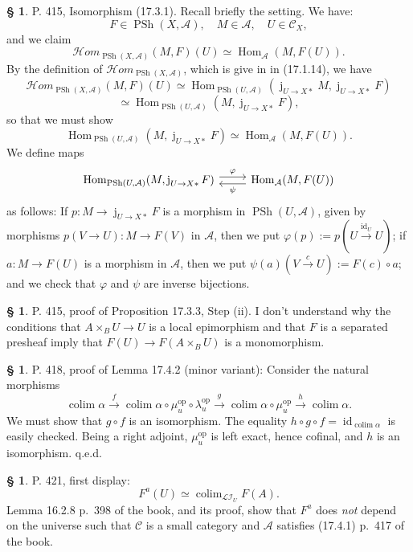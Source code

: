 \documentclass[12pt]{article}%
\theoremstyle{remark}
\theoremstyle{definition}
\newtheorem{s}[thm]{\S}%
\newcommand{\cc}{\mathcal}
\newcommand{\oo}{\operatorname}
\newcommand{\A}{\mathcal A}
\newcommand{\C}{\mathcal C}
\newcommand{\pp}{\varphi}
\newcommand{\xr}{\xrightarrow}
\DeclareMathOperator*{\colim}{colim}
\DeclareMathOperator{\id}{id}
\DeclareMathOperator{\Hom}{Hom}%
\DeclareMathOperator{\op}{op}
\begin{document}
\begin{s}
P. 415, Isomorphism (17.3.1). Recall briefly the setting. We have: 
$$
F\in\oo{PSh}(X,\A),\quad M\in\A,\quad U\in\C_X,
$$ 
and we claim 
\begin{equation}\label{1731}
\cc H\mathit{om}_{\oo{PSh}(X,\A)}(M,F)(U)\simeq\Hom_\A(M,F(U)).
\end{equation} 
By the definition of $\cc H\mathit{om}_{\oo{PSh}(X,\A)}$, which is give in in (17.1.14), we have 
$$
\cc H\mathit{om}_{\oo{PSh}(X,\A)}(M,F)(U)\simeq\Hom_{\oo{PSh}(U,\A)}(\oo j_{U\to X*}M,\oo j_{U\to X*}F)
$$ 
$$
\simeq\Hom_{\oo{PSh}(U,\A)}(M,\oo j_{U\to X*}F), 
$$ 
so that we must show 
$$
\Hom_{\oo{PSh}(U,\A)}(M,\oo j_{U\to X*}F)\simeq\Hom_\A(M,F(U)).
$$
We define maps 
$$
\begin{tikzcd}
\Hom_{\oo{PSh}(U,\A)}(M,\oo j_{U\to X*}F)\ar[yshift=0.7ex]{r}{\pp}&\Hom_\A(M,F(U))\ar[yshift=-0.7ex]{l}{\psi}
\end{tikzcd} 
$$ 
as follows: If $p:M\to\oo j_{U\to X*}F$ is a morphism in $\oo{PSh}(U,\A)$, given by morphisms $p(V\to U):M\to F(V)$ in $\A$, then we put $\pp(p):=p(U\xr{\id_U}U)$; if $a:M\to F(U)$ is a morphism in $\A$, then we put $\psi(a)(V\xr cU):=F(c)\circ a$; and we check that $\pp$ and $\psi$ are inverse bijections. 
\end{s}

%

\begin{s}
P. 415, proof of Proposition 17.3.3, Step (ii). I don't understand why the conditions that $A\times_BU\to U$ is a local epimorphism and that $F$ is a separated presheaf imply that $F(U)\to F(A\times_BU)$ is a monomorphism. %
\end{s}

%

\begin{s} 
P. 418, proof of Lemma 17.4.2 (minor variant): Consider the natural morphisms 
$$
\colim\alpha\xr f\colim\alpha\circ\mu_u^{\op}\circ\lambda_u^{\op}\xr g\colim\alpha\circ\mu_u^{\op}\xr h\colim\alpha.
$$
We must show that $g\circ f$ is an isomorphism. The equality $h\circ g\circ f=\id_{\colim\alpha}$ is easily checked. Being a right adjoint, $\mu_u^{\op}$ is left exact, hence cofinal, and $h$ is an isomorphism. q.e.d.
\end{s}

%

\begin{s}\label{fau}
P. 421, first display: 
$$
F^a(U)\simeq\colim_{\cc{LI}_U}F(A).
$$ 
Lemma 16.2.8 p.~398 of the book, and its proof, show that $F^a$ does {\em not} depend on the universe such that $\C$ is a small category and $\A$ satisfies (17.4.1) p.~417 of the book.
\end{s}
\end{document}
